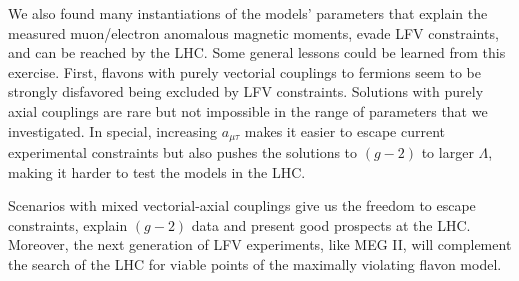\documentclass[prd,amsfonts,onecolumn,superscriptaddress,aps,nofootinbib,11pt]{revtex4-1}
\begin{document}
 We also found many instantiations of the models' parameters that explain the measured muon/electron anomalous magnetic moments, evade LFV constraints, and can be reached by the LHC. Some general lessons could be learned from this exercise. First, flavons with purely vectorial couplings to fermions seem to be strongly disfavored being excluded by LFV constraints. Solutions with purely axial couplings are rare but not impossible in the range of parameters that we investigated. In special, increasing $a_{\mu\tau}$ makes it easier to escape current experimental constraints but also pushes the solutions to $(g-2)$ to larger $\Lambda$, making it harder to test the models in the LHC.

 Scenarios with mixed vectorial-axial couplings give us the freedom to escape constraints, explain $(g-2)$ data and present good prospects at the LHC. Moreover, the next generation of LFV experiments, like MEG II, will complement the search of the LHC for viable points of the maximally violating flavon model. 
 
	


\end{document}
